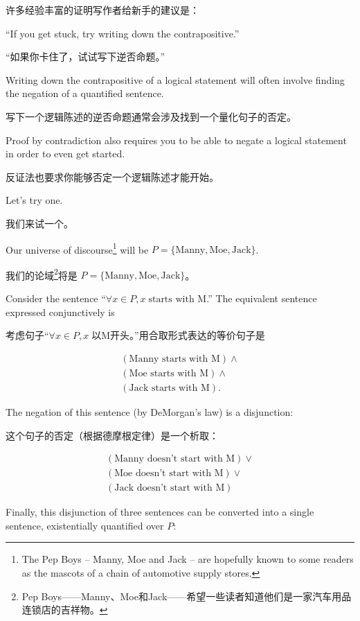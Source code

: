 许多经验丰富的证明写作者给新手的建议是：

``If you get stuck, try writing down the contrapositive.''

“如果你卡住了，试试写下逆否命题。”

Writing down the contrapositive of a logical statement will often involve finding the
negation of a quantified sentence.

写下一个逻辑陈述的逆否命题通常会涉及找到一个量化句子的否定。

Proof by contradiction also requires you to be able to
negate a logical statement in order to even get started.

反证法也要求你能够否定一个逻辑陈述才能开始。

Let's try one.

我们来试一个。

Our universe of discourse\footnote{The Pep Boys -- Manny, Moe and %
Jack -- are hopefully known to some readers as the mascots of a chain %
of automotive supply stores.} 
will be $P = \{ \mbox{Manny}, \mbox{Moe}, \mbox{Jack} \}$.

我们的论域\footnote{Pep Boys——Manny、Moe和Jack——希望一些读者知道他们是一家汽车用品连锁店的吉祥物。}将是 $P = \{ \mbox{Manny}, \mbox{Moe}, \mbox{Jack} \}$。

Consider the sentence 
``$\forall x \in P, x\; \mbox{starts with M}$.''   The equivalent sentence
expressed conjunctively is 

考虑句子“$\forall x \in P, x\; \mbox{以M开头}$。”用合取形式表达的等价句子是

\begin{gather*} (\mbox{Manny starts with M}) \land \\
(\mbox{Moe starts with M}) \land \\
(\mbox{Jack starts with M}).
\end{gather*}

\noindent  The negation
of this sentence (by DeMorgan's law) is a disjunction:

\noindent 这个句子的否定（根据德摩根定律）是一个析取：

\begin{gather*}
(\mbox{Manny doesn't start with M}) \lor \\ 
(\mbox{Moe doesn't start with M}) \lor \\
(\mbox{Jack doesn't start with M})
\end{gather*}

\noindent Finally, this disjunction of three sentences can be converted into 
a single sentence, existentially quantified over $P$:

